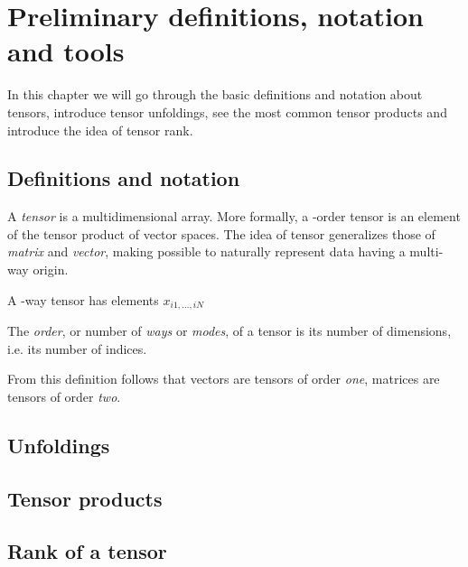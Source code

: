 \chapter{Preliminary definitions, notation and tools}

In this chapter we will go through the basic definitions and notation about tensors, introduce tensor unfoldings, see the most common tensor products and introduce the idea of tensor rank.

\section{Definitions and notation}

A \emph{tensor} is a multidimensional array. More formally, a \N-order tensor is an element of the tensor product of \N vector spaces. The idea of tensor generalizes those of \emph{matrix} and \emph{vector}, making possible to naturally represent data having a multi-way origin.

A \N-way tensor  has elements $x_{i1,\ldots,iN}$

\begin{Def}
  The \emph{order}, or number of \emph{ways} or \emph{modes}, of a tensor is its number of dimensions, i.e. its number of indices.
\end{Def}

From this definition follows that vectors are tensors of order \emph{one}, matrices are tensors of order \emph{two}.



\section{Unfoldings}


\section{Tensor products}


\section{Rank of a tensor}
